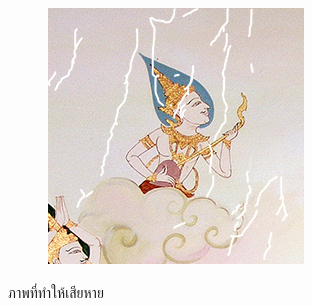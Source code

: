 \begin{figure}[H]
\begin{subfigure}{0.4\linewidth}
		\includegraphics[width=0.8\linewidth]{image/thaiart/case05-toinpaint.png}			
	\end{subfigure}
	\caption{ภาพที่ทำให้เสียหาย}
\end{figure}

